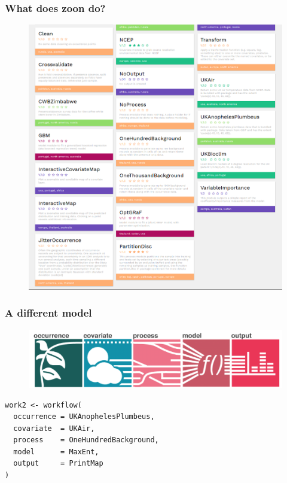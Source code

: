 \documentclass{beamer}
\begin{document}
\begin{frame}[fragile]
\frametitle{What does zoon do?}

\begin{figure}
    \includegraphics[height = 0.85\textheight]{modules}
\end{figure} 
\end{frame}




\begin{frame}[fragile]
\frametitle{A different model}
\begin{figure}
    \includegraphics[width = \textwidth]{diagrams}
\end{figure} 
\renewcommand{\FancyVerbFormatLine}[1]{%
   \ifnum\value{FancyVerbLine}=5\color{cyan}#1%
   \else #1\fi}

\begin{Verbatim}
work2 <- workflow(
  occurrence = UKAnophelesPlumbeus,
  covariate  = UKAir,
  process    = OneHundredBackground,
  model      = MaxEnt,
  output     = PrintMap
)

\end{Verbatim}

\end{frame} 
\end{document}
